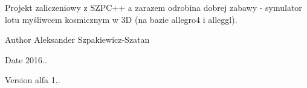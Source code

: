 Projekt zaliczeniowy z S\+Z\+P\+C++ a zarazem odrobina dobrej zabawy -\/ symulator lotu myśliwcem kosmicznym w 3D (na bazie allegro4 i alleggl). \begin{DoxyAuthor}{Author}
Aleksander Szpakiewicz-\/\+Szatan 
\end{DoxyAuthor}
\begin{DoxyDate}{Date}
2016.. 
\end{DoxyDate}
\begin{DoxyVersion}{Version}
alfa 1.. 
\end{DoxyVersion}

